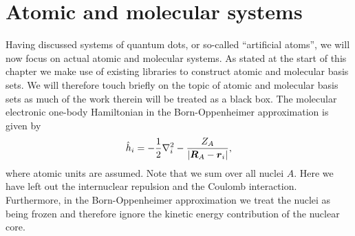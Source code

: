     \section{Atomic and molecular systems}
        \label{sec:atoms-and-molecules}
        Having discussed systems of quantum dots, or so-called ``artificial
        atoms'', we will now focus on actual atomic and molecular systems.
        As stated at the start of this chapter we make use of existing
        libraries to construct atomic and molecular basis sets.
        We will therefore touch briefly on the topic of atomic and molecular
        basis sets as much of the work therein will be treated as a black box.
        The molecular electronic one-body Hamiltonian in the Born-Oppenheimer
        approximation is given by \cite{basis-sets, hochstuhl2014time}
        \begin{align}
            \hat{h}_i
            = -\frac{1}{2} \nabla^2_i
            - \frac{Z_A}{\abs{\boldsymbol{R}_A - \boldsymbol{r}_i}},
        \end{align}
        where atomic units are assumed.
        Note that we sum over all nuclei $A$.
        Here we have left out the internuclear repulsion and the Coulomb
        interaction.
        Furthermore, in the Born-Oppenheimer approximation we treat the nuclei
        as being frozen and therefore ignore the kinetic energy contribution of
        the nuclear core.

